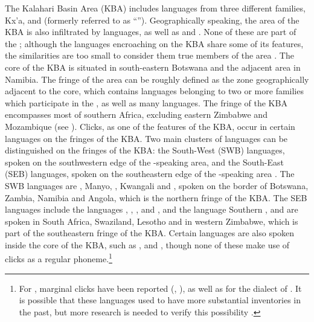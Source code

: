 \documentclass[output=paper
,newtxmath
,modfonts
,nonflat]{langsci/langscibook}
\begin{document}
The Kalahari Basin Area (KBA) includes languages from three different families, Kx’a,  and  (formerly referred to as “”). Geographically speaking, the area of the KBA is also infiltrated by  languages, as well as  and . None of these are part of the ; although the  languages encroaching on the KBA share some of its features, the similarities are too small to consider them true members of the area \citep[18]{güldemanntoappear}. The core of the KBA is situated in south-eastern Botswana and the adjacent area in Namibia. The fringe of the area can be roughly defined as the zone geographically adjacent to the core, which contains languages belonging to two or more families which participate in the , as well as many  languages. The fringe of the KBA encompasses most of southern Africa, excluding eastern Zimbabwe and Mozambique (see ). Clicks, as one of the features of the KBA, occur in certain  languages on the fringes of the KBA. Two main clusters of   languages can be distinguished on the fringes of the KBA: the South-West  (SWB)  languages, spoken on the southwestern edge of the -speaking area, and the South-East  (SEB)  languages, spoken on the southeastern edge of the -speaking area \citep{Pakendorf2017}. The SWB languages are , Manyo, , Kwangali and , spoken on the border of Botswana, Zambia, Namibia and Angola, which is the northern fringe of the KBA. The SEB languages include the  languages , , ,  and , and the  language Southern , and are spoken in South Africa, Swaziland, Lesotho and in western Zimbabwe, which is part of the southeastern fringe of the KBA. Certain  languages are also spoken inside the core of the KBA, such as ,  and , though none of these make use of clicks as a regular phoneme.\footnote{For , marginal clicks have been reported (\citealt[298]{Dickens1987}, \citealt[10]{Lukusa2008}), as well as for the  dialect of  \citep[209-210]{Tlale2005}. It is possible that these languages used to have more substantial  inventories in the past, but more research is needed to verify this possibility \citep{Pakendorf2017}.} 
\end{document}
